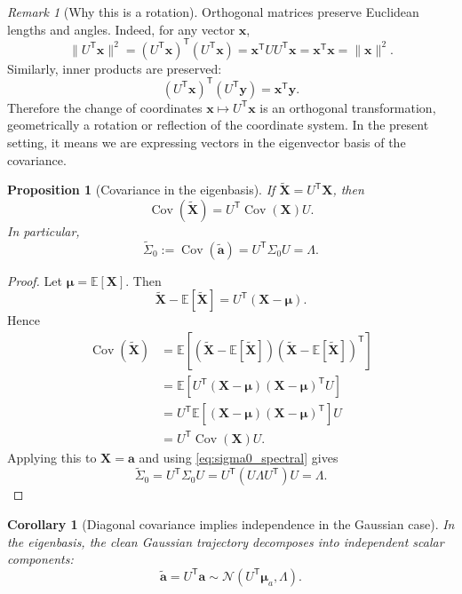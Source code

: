 \documentclass[11pt]{article}
\numberwithin{equation}{section}
\newtheorem{proposition}[theorem]{Proposition}
\newtheorem{corollary}[theorem]{Corollary}
\theoremstyle{definition}
\theoremstyle{remark}
\newtheorem{remark}[theorem]{Remark}
\newcommand{\E}{\mathbb{E}}
\newcommand{\Cov}{\operatorname{Cov}}
\newcommand{\trans}{\mathsf{T}}
\newcommand{\Ncal}{\mathcal{N}}
\newcommand{\norm}[1]{\lVert #1\rVert}
\begin{document}
\begin{remark}[Why this is a rotation]
Orthogonal matrices preserve Euclidean lengths and angles. Indeed, for any vector $\mathbf x$,
\[
\norm{U^\trans\mathbf x}^2
=
(U^\trans\mathbf x)^\trans(U^\trans\mathbf x)
=
\mathbf x^\trans U U^\trans \mathbf x
=
\mathbf x^\trans\mathbf x
=
\norm{\mathbf x}^2.
\]
Similarly, inner products are preserved:
\[
(U^\trans\mathbf x)^\trans(U^\trans\mathbf y)=\mathbf x^\trans\mathbf y.
\]
Therefore the change of coordinates $\mathbf x\mapsto U^\trans\mathbf x$ is an orthogonal transformation, geometrically a rotation or reflection of the coordinate system. In the present setting, it means we are expressing vectors in the eigenvector basis of the covariance.
\end{remark}

\begin{proposition}[Covariance in the eigenbasis]\label{prop:rot_cov}
If $\widetilde{\mathbf X}=U^\trans\mathbf X$, then
\[
\Cov(\widetilde{\mathbf X})=U^\trans \Cov(\mathbf X)U.
\]
In particular,
\[
\widetilde{\Sigma}_0:=\Cov(\widetilde{\mathbf a})
=
U^\trans\Sigma_0 U
=
\Lambda.
\]
\end{proposition}

\begin{proof}
Let $\boldsymbol{\mu}=\E[\mathbf X]$. Then
\[
\widetilde{\mathbf X}-\E[\widetilde{\mathbf X}]
=
U^\trans(\mathbf X-\boldsymbol{\mu}).
\]
Hence
\begin{align*}
\Cov(\widetilde{\mathbf X})
&=
\E\!\left[(\widetilde{\mathbf X}-\E[\widetilde{\mathbf X}])(\widetilde{\mathbf X}-\E[\widetilde{\mathbf X}])^\trans\right] \\
&=
\E\!\left[U^\trans(\mathbf X-\boldsymbol{\mu})(\mathbf X-\boldsymbol{\mu})^\trans U\right] \\
&=
U^\trans \E\!\left[(\mathbf X-\boldsymbol{\mu})(\mathbf X-\boldsymbol{\mu})^\trans\right] U \\
&=
U^\trans \Cov(\mathbf X)U.
\end{align*}
Applying this to $\mathbf X=\mathbf a$ and using \eqref{eq:sigma0_spectral} gives
\[
\widetilde{\Sigma}_0=U^\trans\Sigma_0U=U^\trans(U\Lambda U^\trans)U=\Lambda.
\]
\end{proof}

\begin{corollary}[Diagonal covariance implies independence in the Gaussian case]\label{cor:gauss_indep}
In the eigenbasis, the clean Gaussian trajectory decomposes into independent scalar components:
\[
\widetilde{\mathbf a}=U^\trans\mathbf a
\sim
\Ncal(U^\trans\boldsymbol{\mu}_a,\Lambda).
\]
\end{corollary}
\end{document}
